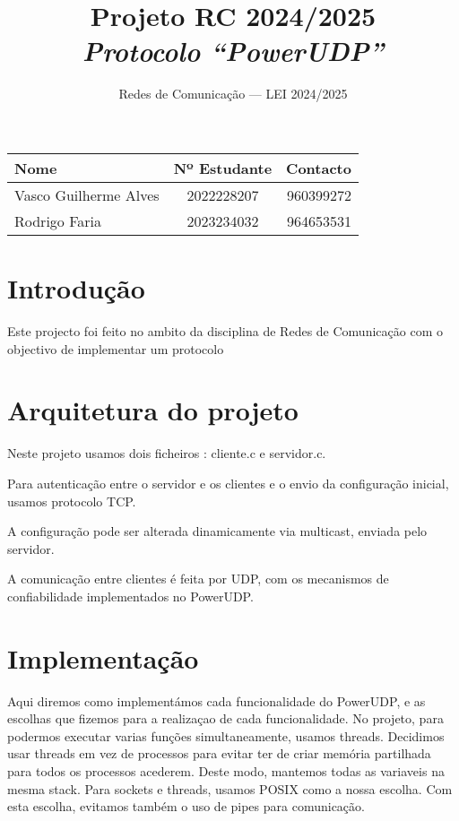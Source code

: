 \documentclass[a4paper, 11pt]{article}
\title{\Huge Projeto RC 2024/2025\\
        \it \huge Protocolo ``PowerUDP''
}
\author{Redes de Comunicação --- LEI 2024/2025}
\date{}
\begin{document}
\maketitle
\begin{center}
    \begin{tabularx}{0.8\textwidth}{Xcr}
    \bf Nome  & \bf Nº Estudante & \bf Contacto  \\\midrule
    Vasco Guilherme Alves & 2022228207 & 960399272\\
    Rodrigo Faria & 2023234032 & 964653531 \\ 
    \end{tabularx}
\end{center}

\tableofcontents

\newpage
\section{Introdução}

Este projecto foi feito no ambito da disciplina de Redes de Comunicação com o objectivo de implementar um protocolo 


\section{Arquitetura do projeto}
Neste projeto usamos dois ficheiros : cliente.c e servidor.c.

Para autenticação entre o servidor e os clientes e o envio da configuração inicial, usamos protocolo TCP.

A configuração pode ser alterada dinamicamente via multicast, enviada pelo servidor.

A comunicação entre clientes é feita por UDP, com os mecanismos de confiabilidade implementados no PowerUDP.
\section{Implementação}
Aqui diremos como implementámos cada funcionalidade do PowerUDP, e as escolhas que fizemos para a realizaçao de cada funcionalidade. No projeto, para podermos executar varias funções simultaneamente, usamos threads. Decidimos usar threads em vez de processos para evitar ter de criar memória partilhada para todos os processos acederem. Deste modo, mantemos todas as variaveis na mesma stack. Para sockets e threads, usamos POSIX como a nossa escolha. Com esta escolha, evitamos também o uso de pipes para comunicação.
\end{document}
